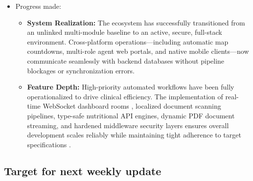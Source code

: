 \documentclass[onecolumn,journal]{IEEEtran}
\begin{document}
\begin{itemize}
\begin{itemize}
			\item \textbf{Notification Dropouts in Low-Bandwidth Zones:} Relying solely on conventional push notification alerts was vulnerable to packet drops in weak signal areas. The team bypassed this problem by building a dual-path pipeline running instant push updates in parallel with a background 15-second client polling check; the system explicitly enforces that a message state is only marked as officially delivered in the database once verified by the polling check.
			
			\item \textbf{Schema Disruption and Legacy Code Integration:} Merging deep structural additions for advanced nutrition templates and new specialist modules risked breaking older relational hooks and core dependencies. This was systematically addressed by conducting a comprehensive database schema refactor with Prisma, deploying automated multi-role seeding scripts to clear environment flags, and updating legacy import/export boundaries across the MBBS module.
		\end{itemize}
		
		\item Progress made:
		\begin{itemize}
			\item \textbf{System Realization:} The ecosystem has successfully transitioned from an unlinked multi-module baseline to an active, secure, full-stack environment. Cross-platform operations—including automatic map countdowns, multi-role agent web portals, and native mobile clients—now communicate seamlessly with backend databases without pipeline blockages or synchronization errors.
			
			\item \textbf{Feature Depth:} High-priority automated workflows have been fully operationalized to drive clinical efficiency. The implementation of real-time WebSocket dashboard rooms \cite{fette2011websocket}, localized document scanning pipelines, type-safe nutritional API engines, dynamic PDF document streaming, and hardened middleware security layers ensures overall development scales reliably while maintaining tight adherence to target specifications \cite{srs2026}.
		\end{itemize}
		
	\end{itemize}
	\subsection{Target for next weekly update}
	
\end{document}
